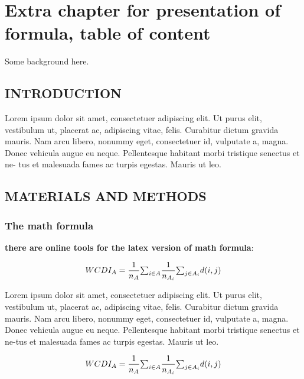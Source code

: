 \chapternumberfont{\fontsize{20pt}{20pt}\selectfont}
\chaptertitlefont{\fontsize{18pt}{18pt}\selectfont}

\chapter{Extra chapter for presentation of formula, table of content}

Some background here.

\section{INTRODUCTION} %

Lorem ipsum dolor sit amet, consectetuer adipiscing elit. Ut purus elit, vestibulum ut, placerat ac, adipiscing vitae, felis. Curabitur dictum gravida mauris. Nam arcu libero, nonummy eget, consectetuer id, vulputate a, magna. Donec vehicula augue eu neque. Pellentesque habitant morbi tristique senectus et ne-
tus et malesuada fames ac turpis egestas. Mauris ut leo.

\section{MATERIALS AND METHODS} %
\subsection{The math formula} %

\textbf{there are online tools for the latex version of math formula}:

\begin{equation}
  \centering
  WCDI_A = \frac{1}{n_A} {\textstyle \sum_{i\in A}^{}}\frac{1}{n_{A_i}}   {\textstyle \sum_{j\in A_i}^{}}d(i, j)
  \end{equation}  

Lorem ipsum dolor sit amet, consectetuer adipiscing elit. Ut purus elit, vestibulum ut, placerat ac, adipiscing vitae, felis. Curabitur dictum gravida mauris. Nam arcu libero, nonummy eget, consectetuer id, vulputate a, magna. Donec vehicula augue eu neque. Pellentesque habitant morbi tristique senectus et ne-tus et malesuada fames ac turpis egestas. Mauris ut leo.

\begin{equation}
  \centering
  WCDI_A = \frac{1}{n_A} {\textstyle \sum_{i\in A}^{}}\frac{1}{n_{A_i}}   {\textstyle \sum_{j\in A_i}^{}}d(i, j)
  \end{equation} 


